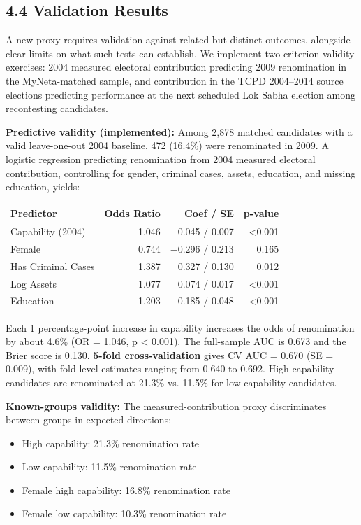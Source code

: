 \documentclass[
]{article}
\newcounter{none} %
\providecommand{\tightlist}{%
  \setlength{\itemsep}{0pt}\setlength{\parskip}{0pt}}
\begin{document}
\subsection{4.4 Validation Results}\label{44-validation-results}

A new proxy requires validation against related but distinct outcomes, alongside clear limits on what such tests can establish. We implement two criterion-validity exercises: 2004 measured electoral contribution predicting 2009 renomination in the MyNeta-matched sample, and contribution in the TCPD 2004--2014 source elections predicting performance at the next scheduled Lok Sabha election among recontesting candidates.

\textbf{Predictive validity (implemented):} Among 2,878 matched candidates with a valid leave-one-out 2004 baseline, 472 (16.4\%) were renominated in 2009. A logistic regression predicting renomination from 2004 measured electoral contribution, controlling for gender, criminal cases, assets, education, and missing education, yields:

{\def\LTcaptype{none} %
\begin{longtable}[]{@{}lrrr@{}}
\toprule\noalign{}
Predictor & Odds Ratio & Coef / SE & p-value \\
\midrule\noalign{}
\endhead
\bottomrule\noalign{}
\endlastfoot
Capability (2004) & 1.046 & 0.045 / 0.007 & \textless0.001 \\
Female & 0.744 & $-$0.296 / 0.213 & 0.165 \\
Has Criminal Cases & 1.387 & 0.327 / 0.130 & 0.012 \\
Log Assets & 1.077 & 0.074 / 0.017 & \textless0.001 \\
Education & 1.203 & 0.185 / 0.048 & \textless0.001 \\
\end{longtable}
}

Each 1 percentage-point increase in capability increases the odds of renomination by about 4.6\% (OR = 1.046, p \textless{} 0.001). The full-sample AUC is 0.673 and the Brier score is 0.130. \textbf{5-fold cross-validation} gives CV AUC = 0.670 (SE = 0.009), with fold-level estimates ranging from 0.640 to 0.692. High-capability candidates are renominated at 21.3\% vs. 11.5\% for low-capability candidates.

\textbf{Known-groups validity:} The measured-contribution proxy discriminates between groups in expected directions:

\begin{itemize}
\tightlist
\item
  High capability: 21.3\% renomination rate
\item
  Low capability: 11.5\% renomination rate
\item
  Female high capability: 16.8\% renomination rate
\item
  Female low capability: 10.3\% renomination rate
\end{itemize}
\end{document}
